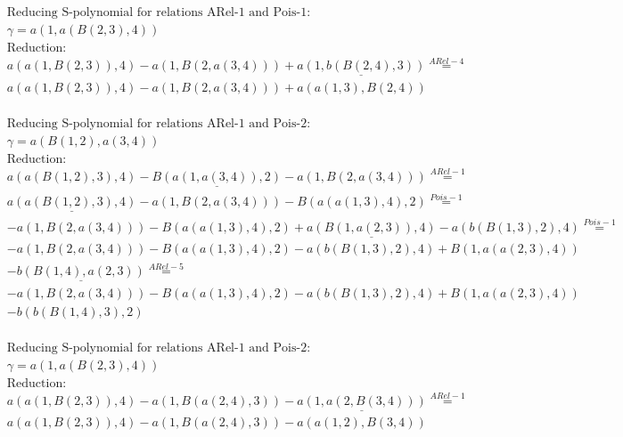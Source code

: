\documentclass[11pt]{amsart}
\begin{document}
\begin{align*} 
& \text{Reducing S-polynomial for relations ARel-1 and Pois-1:} \\ 
& \gamma = a(1,a(B(2,3),4)) \\ 
& \text{Reduction}: \\&a(a(1,B(2,3)),4) - a(1,B(2,a(3,4))) + \underline{a(1,b(B(2,4),3))} \stackrel{ ARel-4 }{=}  \\ 
&a(a(1,B(2,3)),4) - a(1,B(2,a(3,4))) + a(a(1,3),B(2,4))\\ 
\end{align*} 
 
\begin{align*} 
& \text{Reducing S-polynomial for relations ARel-1 and Pois-2:} \\ 
& \gamma = a(B(1,2),a(3,4)) \\ 
& \text{Reduction}: \\&a(a(B(1,2),3),4) - \underline{B(a(1,a(3,4)),2)} - a(1,B(2,a(3,4))) \stackrel{ ARel-1 }{=}  \\ 
&\underline{a(a(B(1,2),3),4)} - a(1,B(2,a(3,4))) - B(a(a(1,3),4),2) \stackrel{ Pois-1 }{=}  \\ 
& - a(1,B(2,a(3,4))) - B(a(a(1,3),4),2) + \underline{a(B(1,a(2,3)),4)} - a(b(B(1,3),2),4) \stackrel{ Pois-1 }{=}  \\ 
& - a(1,B(2,a(3,4))) - B(a(a(1,3),4),2) - a(b(B(1,3),2),4) + B(1,a(a(2,3),4))\\ 
 &  - \underline{b(B(1,4),a(2,3))} \stackrel{ ARel-5 }{=}  \\ 
& - a(1,B(2,a(3,4))) - B(a(a(1,3),4),2) - a(b(B(1,3),2),4) + B(1,a(a(2,3),4))\\ 
 &  - b(b(B(1,4),3),2)\\ 
\end{align*} 
 
\begin{align*} 
& \text{Reducing S-polynomial for relations ARel-1 and Pois-2:} \\ 
& \gamma = a(1,a(B(2,3),4)) \\ 
& \text{Reduction}: \\&a(a(1,B(2,3)),4) - a(1,B(a(2,4),3)) - \underline{a(1,a(2,B(3,4)))} \stackrel{ ARel-1 }{=}  \\ 
&a(a(1,B(2,3)),4) - a(1,B(a(2,4),3)) - a(a(1,2),B(3,4))\\ 
\end{align*} 
 
\end{document}
